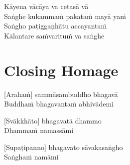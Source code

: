 
Kāyena vācāya va cetasā vā\\
Saṅghe kukammaṁ pakataṁ mayā yaṁ\\
Saṅgho paṭiggaṇhātu accayantaṁ\\
Kālantare saṁvarituṁ va saṅghe

\section*{Closing Homage}

[Arahaṁ] sammāsambuddho bhagavā\\
Buddhaṁ bhagavantaṁ abhivādemi

[Svākkhāto] bhagavatā dhammo\\
Dhammaṁ namassāmi

[Supaṭipanno] bhagavato sāvakasaṅgho\\
Saṅghaṁ namāmi

